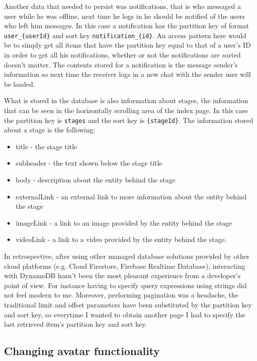 Another data that needed to persist was notifications, that is who messaged a user while he was offline, next time he logs in he should be notified of the users who left him messages. In this case a notification has the partition key of format \verb|user_{userId}| and sort key \verb|notification_{id}|. An access pattern here would be to simply get all items that have the partition key equal to that of a user's ID in order to get all his notifications, whether or not the notifications are sorted doesn't matter. The contents stored for a notification is the message sender's information so next time the receiver logs in a new chat with the sender user will be loaded.

What is stored in the database is also information about stages, the information that can be seen in the horizontally scrolling area of the index page. In this case the partition key is \verb|stages| and the sort key is \verb|{stageId}|. The information stored about a stage is the following:
\begin{itemize}
	\item title - the stage title
	\item subheader - the text shown below the stage title
	\item body - description about the entity behind the stage
	\item externalLink - an external link to more information about the entity behind the stage
	\item imageLink - a link to an image provided by the entity behind the stage
	\item videoLink - a link to a video provided by the entity behind the stage.
\end{itemize}


In retrospective, after using other managed database solutions provided by other cloud platforms (e.g. Cloud Firestore, Firebase Realtime Database), interacting with DynamoDB hasn't been the most pleasant experience from a developer's point of view. For instance having to specify query expressions using strings did not feel modern to me. Moreover, performing pagination was a headache, the traditional limit and offset parameters have been substituted by  the partition key and sort key, so everytime I wanted to obtain another page I had to specify the last retrieved item's partition key and sort key.


\subsection{Changing avatar functionality}

